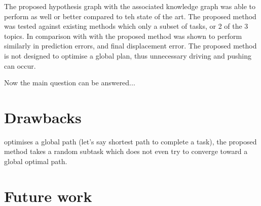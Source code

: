 The proposed hypothesis graph with the associated knowledge graph was able to perform as well or better compared to teh state of the art. The proposed method was tested against existing methods which only a subset of tasks, or 2 of the 3 topics. In comparison with with\cite{sabbaghnovin_model_2021} the proposed method was shown to perform similarly in prediction errors, and final displacement error. The proposed method is not designed to optimise a global plan, thus unnecessary driving and pushing can occur. 
\vspace{\baselineskip}

Now the main question can be answered...


\section{Drawbacks}
\cite{vega-brown_asymptotically_2020} optimises a global path (let's say shortest path to complete a task), the proposed method takes a random subtask which does not even try to converge toward a global optimal path. 

\section{Future work}%
\label{sec:future_work}

